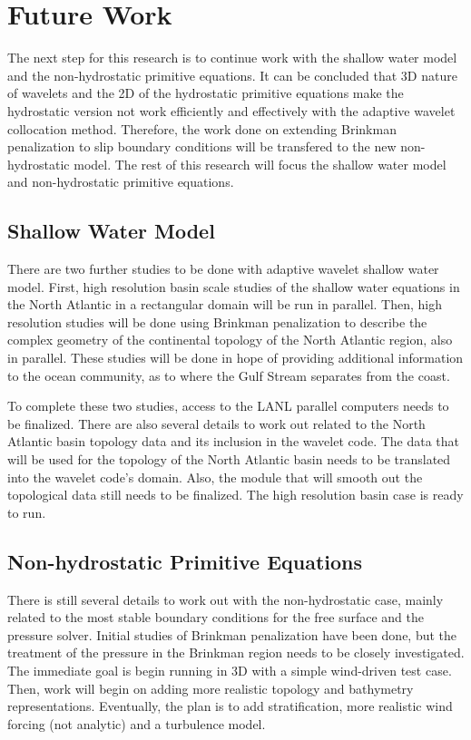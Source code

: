 \chapter{Future Work}
\label{chapter:6}

The next step for this research is to continue work with the shallow water model and the non-hydrostatic primitive equations.  It can be concluded that 3D nature of wavelets and the 2D of the hydrostatic primitive equations make the hydrostatic version not work efficiently and effectively with the adaptive wavelet collocation method.  Therefore, the work done on extending Brinkman penalization to slip boundary conditions will be transfered to the new non-hydrostatic model.  The rest of this research will focus the shallow water model and non-hydrostatic primitive equations.

\section{Shallow Water Model}

There are two further studies to be done with adaptive wavelet shallow water model.  First, high resolution basin scale studies of the shallow water equations in the North Atlantic in a rectangular domain will be run in parallel.  Then, high resolution studies will be done using Brinkman penalization to describe the complex geometry of the continental topology of the North Atlantic region, also in parallel.  These studies will be done in hope of providing additional information to the ocean community, as to where the Gulf Stream separates from the coast.  

To complete these two studies, access to the LANL parallel computers needs to be finalized.  There are also several details to work out related to the North Atlantic basin topology data and its inclusion in the wavelet code.  The data that will be used for the topology of the North Atlantic basin needs to be translated into the wavelet code's domain.  Also, the module that will smooth out the topological data still needs to be finalized.  The high resolution basin case is ready to run.  

\section{Non-hydrostatic Primitive Equations}

There is still several details to work out with the non-hydrostatic case, mainly related to the most stable boundary conditions for the free surface and the pressure solver.  Initial studies of Brinkman penalization have been done, but the treatment of the pressure in the Brinkman region needs to be closely investigated.  The immediate goal is begin running in 3D with a simple wind-driven test case.  Then, work will begin on adding more realistic topology and bathymetry representations.  Eventually, the plan is to add stratification, more realistic wind forcing (not analytic) and a turbulence model.